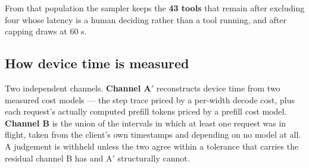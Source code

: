 From that population the sampler keeps the \textbf{43 tools} that remain after excluding four whose latency is a human deciding rather than a tool running, and after capping draws at 60 s.

\subsection{How device time is measured}

Two independent channels. \textbf{Channel A$'$} reconstructs device time from two measured cost models --- the step trace priced by a per-width decode cost, plus each request's actually computed prefill tokens priced by a prefill cost model. \textbf{Channel B} is the union of the intervals in which at least one request was in flight, taken from the client's own timestamps and depending on no model at all. A judgement is withheld unless the two agree within a tolerance that carries the residual channel B has and A$'$ structurally cannot.
